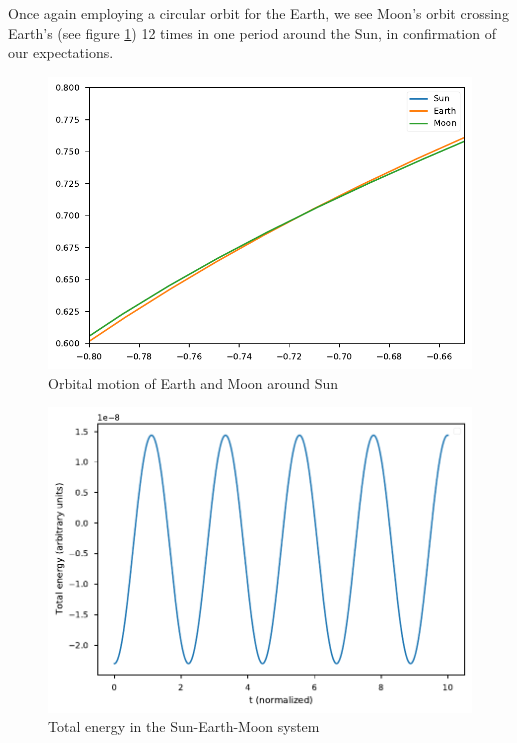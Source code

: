 \documentclass{aa}
\begin{document}
Once again employing a circular orbit for the Earth, we see Moon's orbit
crossing Earth's (see figure \ref{fig:sun_earth_moon}) 12 times in one
period around the Sun, in confirmation of our expectations.

\begin{figure}
  \centering
  \includegraphics[width=\linewidth]{figs/sun_earth_moon.pdf}
  \caption{Orbital motion of Earth and Moon around Sun}
  \label{fig:sun_earth_moon}
\end{figure}

\begin{figure}
  \centering
  \includegraphics[width=\linewidth]{figs/sun_earth_moon_energy.pdf}
  \caption{Total energy in the Sun-Earth-Moon system}
  \label{fig:sun_earth_moon_energy}
\end{figure}
\end{document}
